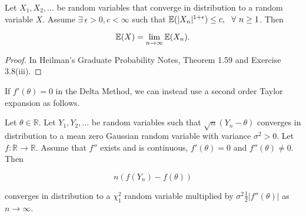 \begin{theorem} Let \(X_1, X_2, \ldots\) be random variables that converge in distribution to a random variable \(X\). Assume \(\exists \ \epsilon > 0, c < \infty\) such that \(\E(|X_n|^{1 + \epsilon}) \leq c , \ \ \forall \ n \geq 1\). Then

\[
\E(X) = \lim_{n \to \infty} \E(X_n).
\]

\end{theorem}

\begin{proof} In Heilman's Graduate Probability Notes, Theorem 1.59 and Exercise 3.8(iii).

\end{proof}

If \(f'(\theta) = 0\) in the Delta Method, we can instead use a second order Taylor expansion as follows.

\begin{theorem}Let \(\theta \in \mathbb{R}\). Let \(Y_1, Y_2, \ldots\) be random variables such that \(\sqrt{n}(Y_n - \theta)\) converges in distribution to a mean zero Gaussian random variable with variance \(\sigma^2 > 0\). Let \(f: \mathbb{R} \to \mathbb{R}\). Assume that \(f''\) exists and is continuous, \(f'(\theta) = 0\) and \(f''(\theta) \neq 0\). Then

\[
n(f(Y_n) - f(\theta))
\]

converges in distribution to a \(\chi_1^2\) random variable multiplied by \(\sigma^2 \frac{1}{2} | f''(\theta)|\) as \(n \to \infty\).

\end{theorem}

